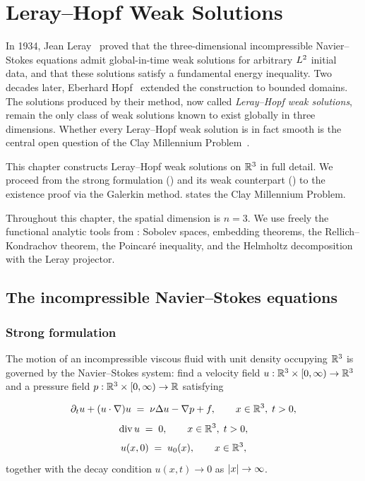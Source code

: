 \chapter{Leray--Hopf Weak Solutions}\label{ch:leray-hopf}

In 1934, Jean Leray~\cite{leray1934} proved that the three-dimensional incompressible
Navier--Stokes equations admit global-in-time weak solutions for arbitrary $L^{2}$
initial data, and that these solutions satisfy a fundamental energy inequality.
Two decades later, Eberhard Hopf~\cite{hopf1951} extended the construction to bounded
domains.  The solutions produced by their method, now called \emph{Leray--Hopf weak
solutions}, remain the only class of weak solutions known to exist globally in three
dimensions.  Whether every Leray--Hopf weak solution is in fact smooth is the central
open question of the Clay Millennium Problem~\cite{fefferman2006}.

This chapter constructs Leray--Hopf weak solutions on $\mathbb{R}^{3}$ in full
detail.  We proceed from the strong formulation ()
and its weak counterpart () to the existence proof
via the Galerkin method.   states the Clay Millennium
Problem.

Throughout this chapter, the spatial dimension is $n = 3$.  We use freely
the functional analytic tools from : Sobolev spaces,
embedding theorems, the Rellich--Kondrachov theorem, the Poincar\'{e}
inequality, and the Helmholtz decomposition with the Leray projector.

\section{The incompressible Navier--Stokes equations}\label{sec:ns-strong}

\subsection{Strong formulation}

The motion of an incompressible viscous fluid with unit density occupying $\mathbb{R}^{3}$ is
governed by the Navier--Stokes system: find a velocity field
$u : \mathbb{R}^{3} \times [0, \infty) \to \mathbb{R}^{3}$ and a pressure field
$p : \mathbb{R}^{3} \times [0, \infty) \to \mathbb{R}$ satisfying

\begin{equation}\label{eq:ns-momentum}
  \partial_{t} u + (u \cdot \nabla) u
  \;=\;
  \nu \Delta u - \nabla p + f,
  \qquad x \in \mathbb{R}^{3},\; t > 0,
\end{equation}
\begin{equation}\label{eq:ns-incompressibility}
  \operatorname{div} u
  \;=\;
  0,
  \qquad x \in \mathbb{R}^{3},\; t > 0,
\end{equation}
\begin{equation}\label{eq:ns-initial}
  u(x, 0)
  \;=\;
  u_{0}(x),
  \qquad x \in \mathbb{R}^{3},
\end{equation}
together with the decay condition $u(x, t) \to 0$ as $\left\lvert x \right\rvert \to \infty$.


